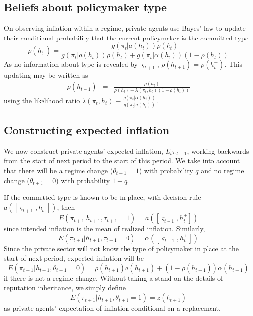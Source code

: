 \documentclass[12pt,letter,leqno]{article}
\theoremstyle{asn}
\theoremstyle{lem}
\theoremstyle{slem}
\theoremstyle{prop}
\theoremstyle{appprop}
\theoremstyle{rem}
\theoremstyle{defn}
\begin{document}
\subsection{Beliefs about policymaker type}\label{appsec:recursive4}

On observing inflation within a regime, private agents use Bayes' law to
update their conditional probability that the current policymaker is the committed
type 
\begin{equation}
\rho (h_{t}^{+}) =\frac{g(\pi _{t}|a(h_{t}))\rho (h_{t})}{g(\pi_{t}|a(h_{t}))\rho (h_{t})+g(\pi _{t}|\alpha (h_{t}))(1-\rho (h_{t}))}
\label{rho update} 
\end{equation}%
As no information about type is revealed by $\varsigma
_{t+1}$, $\rho (h_{t+1})=\rho (h_{t}^{+})$. This updating may be written as
\begin{eqnarray}
\rho (h_{t+1}) &=&\frac{\rho (h_{t})}{\rho (h_{t})+\lambda(\pi _{t},h_{t})(1-\rho (h_{t}))}
\label{rho updateLR} 
\end{eqnarray}%
using the likelihood ratio $\lambda(\pi _{t},h_{t})\equiv\frac{g(\pi
_{t}|\alpha(h_{t}))}{g(\pi _{t}|a(h_{t}))}$.
\subsection{Constructing expected inflation}\label{appsec:recursive5}

We now construct private agents' expected inflation, $E_t\pi _{t+1}$,
working backwards from the start of next period to the start of this period. We take into account that there will be a regime change ($\theta_{t+1}=1$) with probability $q$ and no regime change ($\theta_{t+1}=0$) with probability $1-q$.

If the committed type is known to be in place, with decision rule $%
a([\varsigma _{t+1},h_{t}^{+}])$, then  
\begin{equation*}
E(\pi _{t+1}|h_{t+1},\tau_{t+1}=1)=a([\varsigma _{t+1},h_{t}^{+}])
\end{equation*}%
since intended inflation is the mean of realized inflation. Similarly,%
\begin{equation*}
E(\pi _{t+1}|h_{t+1},\tau_{t+1}=0)=\alpha ([\varsigma _{t+1},h_{t}^{+}])
\end{equation*}
Since the private sector will not know the type of policymaker in place at the start of next period, expected inflation will be 
\begin{equation}\label{eq:ep1}
E(\pi_{t+1}|h_{t+1},\theta_{t+1}=0)=\rho (h_{t+1})a(h_{t+1})+(1-\rho
(h_{t+1}))\alpha (h_{t+1})
\end{equation}%
if there is not a regime change.  Without taking a stand on the details of reputation inheritance, we simply
define 
\begin{equation}\label{eq:ep2}
E(\pi_{t+1}|h_{t+1},\theta_{t+1}=1)=z(h_{t+1})
\end{equation}%
as private agents' expectation of inflation conditional on a
replacement. 
\end{document}
